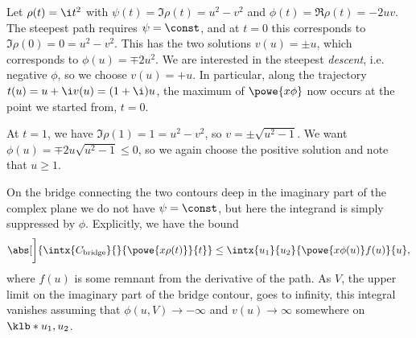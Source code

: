 \documentclass[english, parskip=full]{scrbook}
\newcommand{\example}[3]{\begin{tcolorbox}[colback=colorbackgroundexample,colframe=colorexample, breakable,enhanced,title={\textbf{#1}: #2.}]#3\end{tcolorbox}}
\begin{document}
\example{Full asymptotic expansion}{$I(x) = \intx{0}{1}{\powe{\i xt^2}}{t}$ as $x\rightarrow\infty$}{Let $\rho(t)=\i t^2$ with $\psi(t) = \Im \rho(t) = u^2-v^2$ and $\phi(t) = \Re \rho(t) = -2uv$.
The steepest path requires $\psi=\const$, and at $t=0$ this corresponds to $\Im\rho(0)=0=u^2-v^2$.
This has the two solutions $v(u) = \pm u$, which corresponds to $\phi(u) = \mp 2u^2$.
We are interested in the steepest \emph{descent}, i.e. negative $\phi$, so we choose $v(u)=+u$.
In particular, along the trajectory $t(u) = u + \i v(u) = (1+\i)u$, the maximum of $\powe{x\phi}$ now occurs at the point we started from, $t=0$.

At $t=1$, we have $\Im\rho(1)=1=u^2-v^2$, so $v=\pm\sqrt{u^2-1}$.
We want $\phi(u) = \mp 2u \sqrt{u^2-1} \le 0$, so we again choose the positive solution and note that $u\ge 1$.

On the bridge connecting the two contours deep in the imaginary part of the complex plane we do not have $\psi=\const$, but here the integrand is simply suppressed by $\phi$.
Explicitly, we have the bound
\begin{align}
\abs[\bigg]{\intx{C_\text{bridge}}{}{\powe{x \rho(t)}}{t}} \le \intx{u_1}{u_2}{\powe{x\phi(u)} f(u)}{u},
\end{align}
where $f(u)$ is some remnant from the derivative of the path.
As $V$, the upper limit on the imaginary part of the bridge contour, goes to infinity, this integral vanishes assuming that $\phi(u,V) \rightarrow -\infty$ and $v(u) \rightarrow\infty$ somewhere on $\klb*{u_1,u_2}$.

}
\end{document}
